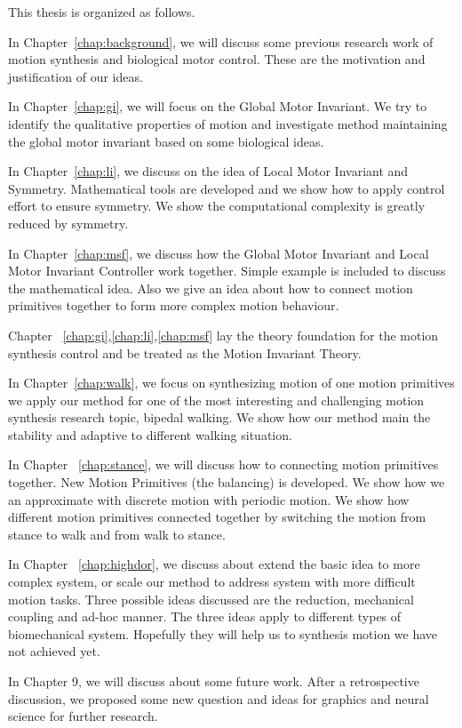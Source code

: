 This thesis is organized as follows.
 
In Chapter~\ref{chap:background}, we will discuss some previous research work of motion synthesis  and biological motor control. 
These are the motivation and justification of our ideas.
 
In Chapter~\ref{chap:gi}, we will focus on the Global Motor Invariant. 
We try to identify the qualitative properties of motion and investigate method maintaining the global motor invariant based on some biological ideas.

In Chapter~\ref{chap:li}, we discuss on the idea of Local Motor Invariant and Symmetry.
Mathematical tools are developed and we show how to apply control effort to ensure symmetry. 
We show the computational complexity is greatly reduced by symmetry.

In Chapter~\ref{chap:msf}, we discuss how the Global Motor Invariant and Local Motor Invariant Controller work together. 
Simple example is included to discuss the mathematical idea. 
Also we give an idea about how to connect motion primitives together to form more complex motion behaviour.

Chapter ~\ref{chap:gi},\ref{chap:li},\ref{chap:msf} lay the theory foundation for the motion synthesis control and be treated as the Motion Invariant Theory.


In Chapter~\ref{chap:walk}, we focus on synthesizing motion of one motion primitives
 we apply our method for one of the most interesting and challenging motion synthesis research topic, bipedal walking. We show how our method main the stability and adaptive to different walking situation.


In Chapter ~\ref{chap:stance}, we will discuss how to connecting motion primitives together.
New Motion Primitives (the balancing) is developed. We show how we an approximate with discrete motion with periodic motion. We show how different motion primitives connected together by switching the motion from stance to walk and from walk to stance.

In Chapter ~\ref{chap:highdor}, we discuss about extend the basic idea to more complex system, or scale our method to address system with more difficult motion tasks. Three possible ideas discussed are the reduction, mechanical coupling and ad-hoc manner. The three ideas apply to different types of biomechanical system.
Hopefully they will help us to synthesis motion we have not achieved yet.

In Chapter 9, we will discuss about some future work. After a retrospective discussion, we proposed some new question and ideas for graphics and neural science for further research.








